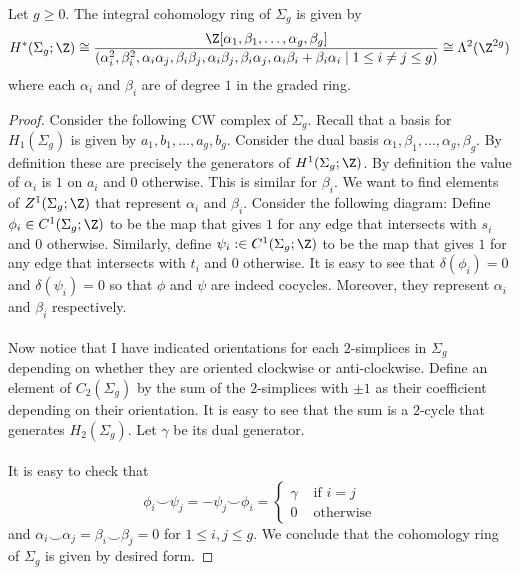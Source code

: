 \documentclass[a4paper]{article}
\begin{document}
\begin{prp}{}{} Let $g\geq 0$. The integral cohomology ring of $\Sigma_g$ is given by $$H^\ast(\Sigma_g;\Z)\cong\frac{\Z[\alpha_1,\beta_1,\dots,\alpha_g,\beta_g]}{(\alpha_i^2,\beta_i^2,\alpha_i\alpha_j,\beta_i\beta_j,\alpha_i\beta_j,\beta_i\alpha_j,\alpha_i\beta_i+\beta_i\alpha_i\;|\;1\leq i\neq j\leq g)}\cong\Lambda^2(\Z^{2g})$$ where each $\alpha_i$ and $\beta_i$ are of degree $1$ in the graded ring. \tcbline
\begin{proof}
Consider the following CW complex of $\Sigma_g$. Recall that a basis for $H_1(\Sigma_g)$ is given by $a_1,b_1,\dots,a_g,b_g$. Consider the dual basis $\alpha_1,\beta_1,\dots,\alpha_g,\beta_g$. By definition these are precisely the generators of $H^1(\Sigma_g;\Z)$. By definition the value of $\alpha_i$ is $1$ on $a_i$ and $0$ otherwise. This is similar for $\beta_i$. We want to find elements of $Z^1(\Sigma_g;\Z)$ that represent $\alpha_i$ and $\beta_i$. Consider the following diagram: Define $\phi_i\in C^1(\Sigma_g;\Z)$ to be the map that gives $1$ for any edge that intersects with $s_i$ and $0$ otherwise. Similarly, define $\psi_i:\in C^1(\Sigma_g;\Z)$ to be the map that gives $1$ for any edge that intersects with $t_i$ and $0$ otherwise. It is easy to see that $\delta(\phi_i)=0$ and $\delta(\psi_i)=0$ so that $\phi$ and $\psi$ are indeed cocycles. Moreover, they represent $\alpha_i$ and $\beta_i$ respectively. \\~\\

Now notice that I have indicated orientations for each $2$-simplices in $\Sigma_g$ depending on whether they are oriented clockwise or anti-clockwise. Define an element of $C_2(\Sigma_g)$ by the sum of the $2$-simplices with $\pm1$ as their coefficient depending on their orientation. It is easy to see that the sum is a $2$-cycle that generates $H_2(\Sigma_g)$. Let $\gamma$ be its dual generator. \\~\\

It is easy to check that $$\phi_i\smile\psi_j=-\psi_j\smile\phi_i=\begin{cases}
\gamma & \text{ if }i=j\\
0 & \text{ otherwise}
\end{cases}$$
and $\alpha_i\smile\alpha_j=\beta_i\smile\beta_j=0$ for $1\leq i,j\leq g$. We conclude that the cohomology ring of $\Sigma_g$ is given by desired form. 
\end{proof}
\end{prp}
\end{document}
